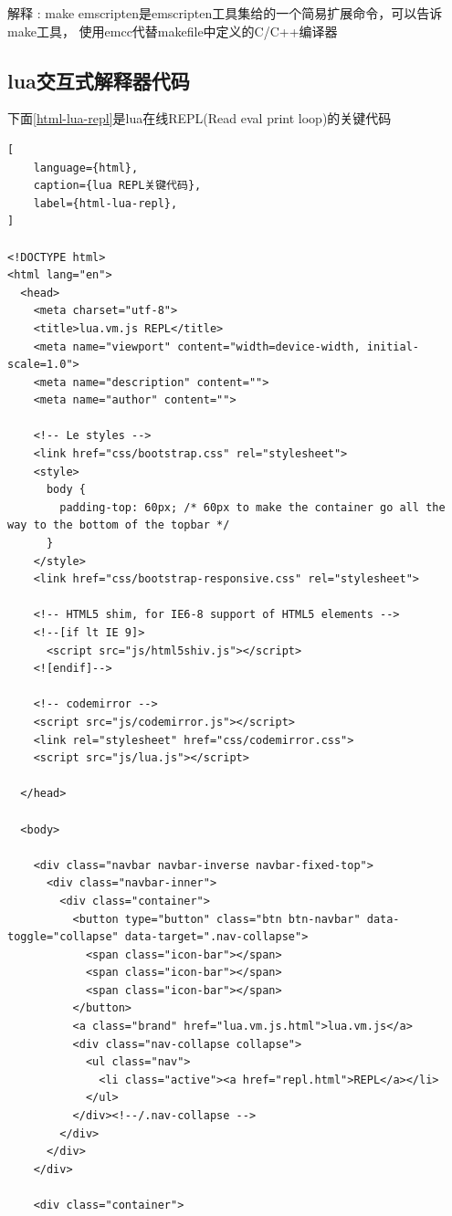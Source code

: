 {\heiti 解释 : } make emscripten是emscripten工具集给的一个简易扩展命令，可以告诉make工具，
使用emcc代替makefile中定义的C/C++编译器

\subsection{lua交互式解释器代码}

下面\ref{html-lua-repl}是lua在线REPL(Read eval print loop)的关键代码

\begin{lstlisting}[
    language={html},
    caption={lua REPL关键代码},
    label={html-lua-repl},
]

<!DOCTYPE html>
<html lang="en">
  <head>
    <meta charset="utf-8">
    <title>lua.vm.js REPL</title>
    <meta name="viewport" content="width=device-width, initial-scale=1.0">
    <meta name="description" content="">
    <meta name="author" content="">

    <!-- Le styles -->
    <link href="css/bootstrap.css" rel="stylesheet">
    <style>
      body {
        padding-top: 60px; /* 60px to make the container go all the way to the bottom of the topbar */
      }
    </style>
    <link href="css/bootstrap-responsive.css" rel="stylesheet">

    <!-- HTML5 shim, for IE6-8 support of HTML5 elements -->
    <!--[if lt IE 9]>
      <script src="js/html5shiv.js"></script>
    <![endif]-->

    <!-- codemirror -->
    <script src="js/codemirror.js"></script>
    <link rel="stylesheet" href="css/codemirror.css">
    <script src="js/lua.js"></script>

  </head>

  <body>

    <div class="navbar navbar-inverse navbar-fixed-top">
      <div class="navbar-inner">
        <div class="container">
          <button type="button" class="btn btn-navbar" data-toggle="collapse" data-target=".nav-collapse">
            <span class="icon-bar"></span>
            <span class="icon-bar"></span>
            <span class="icon-bar"></span>
          </button>
          <a class="brand" href="lua.vm.js.html">lua.vm.js</a>
          <div class="nav-collapse collapse">
            <ul class="nav">
              <li class="active"><a href="repl.html">REPL</a></li>
            </ul>
          </div><!--/.nav-collapse -->
        </div>
      </div>
    </div>

    <div class="container">


\end{lstlisting}
